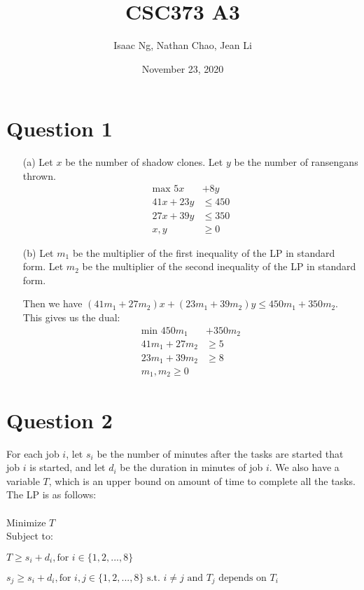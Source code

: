\documentclass{article}
\title{CSC373 A3}
\author{Isaac Ng, Nathan Chao, Jean Li}
\date{November 23, 2020}
\begin{document}
\maketitle
\section{Question 1}
\begin{enumerate}
    \item[(a)]Let $x$ be the number of shadow clones. Let $y$ be the number of ransengans thrown.
    \begin{align*}
        \text{max } 5x &+ 8y\\
        41x + 23y &\leq 450\\
        27x + 39y&\leq 350\\
        x, y &\geq 0
    \end{align*}
    \item[(b)] Let $m_1$ be the multiplier of the first inequality of the LP in standard form. Let $m_2$ be the multiplier of the second inequality of the LP in standard form.
    
    Then we have $(41m_1 + 27m_2)x + (23m_1 + 39m_2)y \leq 450m_1 + 350m_2$. This gives us the dual:
    \begin{align*}
        \text{min }450m_1 &+ 350m_2\\
        41m_1 + 27m_2 &\geq 5\\
        23m_1 + 39m_2 &\geq 8\\
        m_1, m_2 \geq 0
    \end{align*}
\end{enumerate}

\section{Question 2}
For each job $i$, let $s_i$ be the number of minutes after the tasks are started that job $i$ is started, and let $d_i$ be the duration in minutes of job $i$. 
We also have a variable $T$, which is an upper bound on amount of time to complete all the tasks. The LP is as follows:
\\\\
Minimize $T$ \\
Subject to:

$T \geq s_i + d_i, \text{for } i \in \{1, 2, ...,8\}$

$s_j \geq s_i + d_i, \text{for } i, j \in \{1, 2, ..., 8\}  \text{ s.t. } i\neq j \text{ and } T_j \text{ depends on } T_i$
\end{document}
